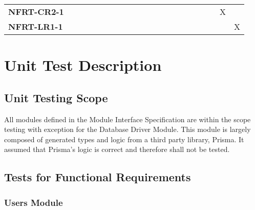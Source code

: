 \documentclass[12pt, titlepage]{article}
\begin{document}
\begin{landscape}
\begin{longtable}{|l|cccccccccccccc|}
		\textbf{NFRT-CR2-1} & ~                                                         & ~            & ~            & ~            & ~            & ~            & ~            & ~            & ~            & ~            & ~            & ~            & X            & ~            \\
		\textbf{NFRT-LR1-1} & ~                                                         & ~            & ~            & ~            & ~            & ~            & ~            & ~            & ~            & ~            & ~            & ~            & ~            & X            \\
		\hline
	\end{longtable}
\end{landscape}

\section{Unit Test Description} \label{Unit Test Description}

\subsection{Unit Testing Scope}


All modules defined in the Module Interface Specification are within the scope testing with
exception for the Database Driver Module. This module is largely composed of generated types and
logic from a third party library, Prisma. It assumed that Prisma's logic is correct and therefore
shall not be tested.

\subsection{Tests for Functional Requirements}


\subsubsection{Users Module}
\end{document}
